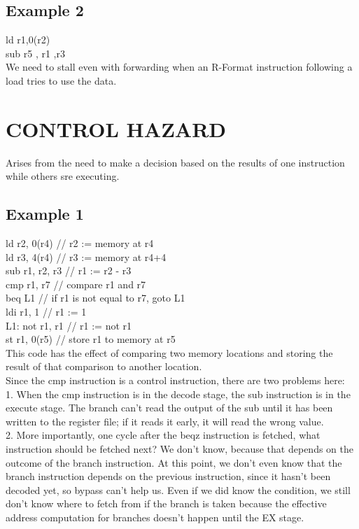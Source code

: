 \documentclass{scrreprt}
\begin{document}
\subsection{Example 2}
ld r1,0(r2)\\
sub r5 , r1 ,r3\\

We need to stall even with forwarding when an R-Format instruction following a load tries to use the data.

\section{CONTROL HAZARD}
Arises from the need to make a decision based on the results of one instruction while others sre executing. \\

\subsection{Example 1}
	ld	r2, 0(r4)   // r2 := memory at r4\\
	ld	r3, 4(r4)	// r3 := memory at r4+4\\
	sub	r1, r2, r3	// r1 := r2 - r3\\
	cmp r1, r7    // compare r1 and r7 \\
	beq	 L1		// if r1 is not equal to r7, goto L1\\
	ldi	r1, 1		// r1 := 1\\
L1:	not	r1, r1		// r1 := not r1\\
	st	r1, 0(r5)	// store r1 to memory at r5\\
	
This code has the effect of comparing two memory locations and storing the result of that comparison to another location. \\
Since the cmp instruction is a control instruction, there are two problems here:\\

1.    When the cmp instruction is in the decode stage, the sub instruction is in the execute stage. The branch can't read the output of the sub until it has been written to the register file; if it reads it early, it will read the wrong value.\\

2.    More importantly, one cycle after the beqz instruction is fetched, what instruction should be fetched next? We don't know, because that depends on the outcome of the branch instruction. At this point, we don't even know that the branch instruction depends on the previous instruction, since it hasn't been decoded yet, so bypass can't help us. Even if we did know the condition, we still don't know where to fetch from if the branch is taken because the effective address computation for branches doesn't happen until the EX stage. \\
	
\end{document}
